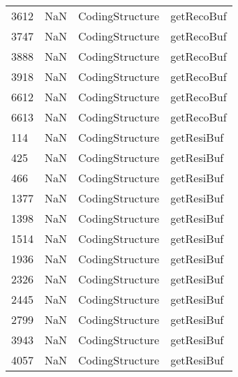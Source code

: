 \begin{tabular}{llll}
3612 &                   NaN &            CodingStructure &                                getRecoBuf \\
3747 &                   NaN &            CodingStructure &                                getRecoBuf \\
3888 &                   NaN &            CodingStructure &                                getRecoBuf \\
3918 &                   NaN &            CodingStructure &                                getRecoBuf \\
6612 &                   NaN &            CodingStructure &                                getRecoBuf \\
6613 &                   NaN &            CodingStructure &                                getRecoBuf \\
114  &                   NaN &            CodingStructure &                                getResiBuf \\
425  &                   NaN &            CodingStructure &                                getResiBuf \\
466  &                   NaN &            CodingStructure &                                getResiBuf \\
1377 &                   NaN &            CodingStructure &                                getResiBuf \\
1398 &                   NaN &            CodingStructure &                                getResiBuf \\
1514 &                   NaN &            CodingStructure &                                getResiBuf \\
1936 &                   NaN &            CodingStructure &                                getResiBuf \\
2326 &                   NaN &            CodingStructure &                                getResiBuf \\
2445 &                   NaN &            CodingStructure &                                getResiBuf \\
2799 &                   NaN &            CodingStructure &                                getResiBuf \\
3943 &                   NaN &            CodingStructure &                                getResiBuf \\
4057 &                   NaN &            CodingStructure &                                getResiBuf \\

\end{tabular}

